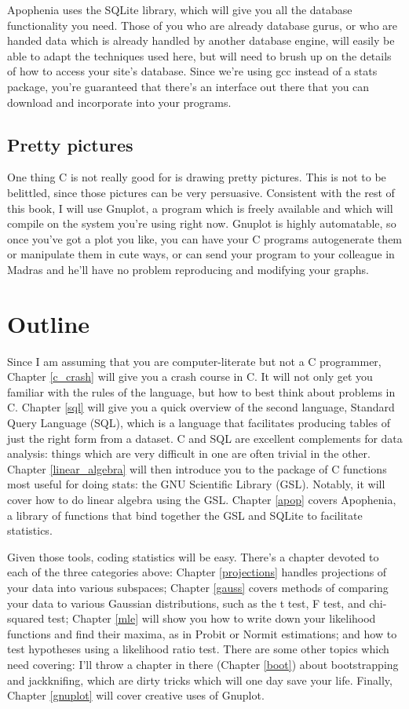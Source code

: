 \documentclass[12pt,notitlepage, openany]{book}
\begin{document}
Apophenia  uses the SQLite library, which will
give you all the database functionality you need. Those of you who are
already database gurus, or who are handed data which is already handled
by another database engine, will easily be able to adapt the techniques
used here, but will need to brush up on the details of how to access
your site's database. Since we're using gcc instead of a stats package,
you're guaranteed that there's an interface out there that you can
download and incorporate into your programs.

\subsection{Pretty pictures} One thing C is not really good for is drawing
pretty pictures. This is not to be belittled, since those pictures
can be very persuasive. Consistent with the rest of this book, I will use
Gnuplot, a program which is freely available and which will compile on
the system you're using right now. Gnuplot is highly automatable, so once
you've got a plot you like, you can have your C programs autogenerate
them or manipulate them in cute ways, or can send your program to your
colleague in Madras and he'll have no problem reproducing and modifying
your graphs.




\section{Outline} Since I am assuming that you are computer-literate but
not a C programmer, Chapter \ref{c_crash} will give you a crash course
in C. It will not only get you familiar with the rules of the language,
but how to best think about problems in C. 
Chapter \ref{sql} will give you a quick overview of the second language,
Standard Query Language (SQL), which is a language that facilitates
producing tables of just the right form from a dataset. C and SQL are
excellent complements for data analysis: things which are very difficult
in one are often trivial in the other.
Chapter \ref{linear_algebra}
will then introduce you to the package of C functions most useful for
doing stats: the GNU Scientific Library (GSL). Notably, it will cover
how to do linear algebra using the GSL. Chapter \ref{apop} covers
Apophenia, a library of functions that bind together the GSL and SQLite
to facilitate statistics.

Given those tools, coding statistics will be easy. There's a chapter
devoted to each of the three categories above: Chapter \ref{projections}
handles projections of your data into various subspaces; Chapter
\ref{gauss} covers methods of comparing your data to various Gaussian
distributions, such as the t test, F test, and chi-squared test; Chapter
\ref{mle} will show you how to write down your likelihood functions and
find their maxima, as in Probit or Normit estimations; and how to test
hypotheses using a likelihood ratio test. There are some other topics
which need covering: I'll throw a chapter in there (Chapter \ref{boot})
about bootstrapping and jackknifing, which are dirty tricks which will one
day save your life.  Finally, Chapter \ref{gnuplot} will cover creative
uses of Gnuplot.
\end{document}
